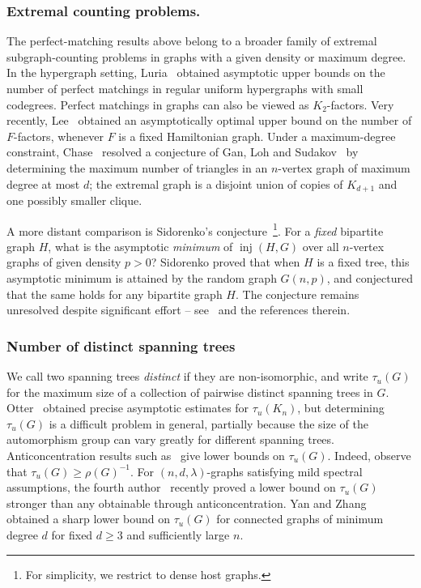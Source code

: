 \documentclass[reqno,final,a4paper]{amsart}
\numberwithin{equation}{section}
\theoremstyle{definition}
\theoremstyle{remark}
\DeclareMathOperator{\inj}{inj}
\begin{document}
\subsubsection{Extremal counting problems.}
The perfect-matching results above belong to a broader family of extremal subgraph-counting problems in graphs with a given density or maximum degree. In the hypergraph setting, Luria~\cite{Luria-n-queens} obtained asymptotic upper bounds on the number of perfect matchings in regular uniform hypergraphs with small codegrees.
Perfect matchings in graphs can also be viewed as $K_2$-factors. Very recently, Lee~\cite{LeeFactors} obtained an asymptotically optimal upper bound on the number of $F$-factors, whenever $F$ is a fixed Hamiltonian graph.
Under a maximum-degree constraint, Chase~\cite{Chase2020} resolved a conjecture of Gan, Loh and Sudakov~\cite{GanLohSudakov2015} by determining the maximum number of triangles in an $n$-vertex graph of maximum degree at most $d$; the extremal graph is a disjoint union of copies of $K_{d+1}$ and one possibly smaller clique.

A more distant comparison is Sidorenko's conjecture~\cite{sidorenko1991inequalities}\footnote{For simplicity, we restrict to dense host graphs.}. For a \textit{fixed} bipartite graph $H$, what is the asymptotic \textit{minimum} of $\inj(H, G)$ over all $n$-vertex graphs of given density $p>0$? Sidorenko proved that when $H$ is a fixed tree, this asymptotic minimum is attained by the random graph $G(n,p)$, and conjectured that the same holds for any bipartite graph $H$. The conjecture remains unresolved despite significant effort -- see~\cite{conlon18-sidorenko,szegedy14} and the references therein.

\subsubsection{Number of distinct spanning trees}
We call two spanning trees \emph{distinct} if they are non-isomorphic, and write $\tau_u(G)$ for the maximum size of a collection of pairwise distinct spanning trees in $G$.
Otter~\cite{Otter} obtained precise asymptotic estimates for $\tau_u(K_n)$, but determining $\tau_u(G)$ is a difficult problem in general, partially because the size of the automorphism group can vary greatly for different spanning trees.
Anticoncentration results such as~ give lower bounds on $\tau_u(G)$. Indeed, observe that $\tau_u(G)\geq \rho(G)^{-1}$.
For $(n,d,\lambda)$-graphs satisfying mild spectral assumptions, the fourth author~\cite{Wang} recently proved a lower bound on $\tau_u(G)$ stronger than any obtainable through anticoncentration. Yan and Zhang~\cite{Yan-Zhang} obtained a sharp lower bound on $\tau_u(G)$ for connected graphs of minimum degree $d$ for fixed $d\geq 3$ and sufficiently large $n$.
\end{document}
